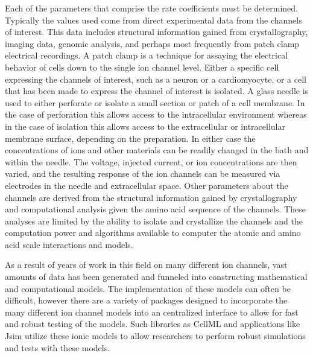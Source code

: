 \documentclass[11pt]{article}
\begin{document}
\par{}
Each of the parameters that comprise the rate coefficients must be determined. Typically the values used come from direct experimental data from the channels of interest. This data includes structural information gained from crystallography, imaging data, genomic analysis, and perhaps most frequently from patch clamp electrical recordings. A patch clamp is a technique for assaying the electrical behavior of cells down to the single ion channel level. Either a specific cell expressing the channels of interest, such as a neuron or a cardiomyocyte, or a cell that has been made to express the channel of interest is isolated. A glass needle is used to either perforate or isolate a small section or patch of a cell membrane. In the case of perforation this allows access to the intracellular environment whereas in the case of isolation this allows access to the extracellular or intracellular membrane surface, depending on the preparation. In either case the concentrations of ions and other materials can be readily changed in the bath and within the needle. The voltage, injected current, or ion concentrations are then varied, and the resulting response of the ion channels can be measured via electrodes in the needle and extracellular space. Other parameters about the channels are derived from the structural information gained by crystallography and computational analysis given the amino acid sequence of the channels. These analyses are limited by the ability to isolate and crystallize the channels and the computation power and algorithms available to computer the atomic and amino acid scale interactions and models.
\par{}
As a result of years of work in this field on many different ion channels, vast amounts of data has been generated and funneled into constructing mathematical and computational models. The implementation of these models can often be difficult, however there are a variety of packages designed to incorporate the many different ion channel models into an centralized interface to allow for fast and robust testing of the models. Such libraries as CellML and applications like Jsim utilize these ionic models to allow researchers to perform robust simulations and tests with these models.
\par{}
\end{document}
